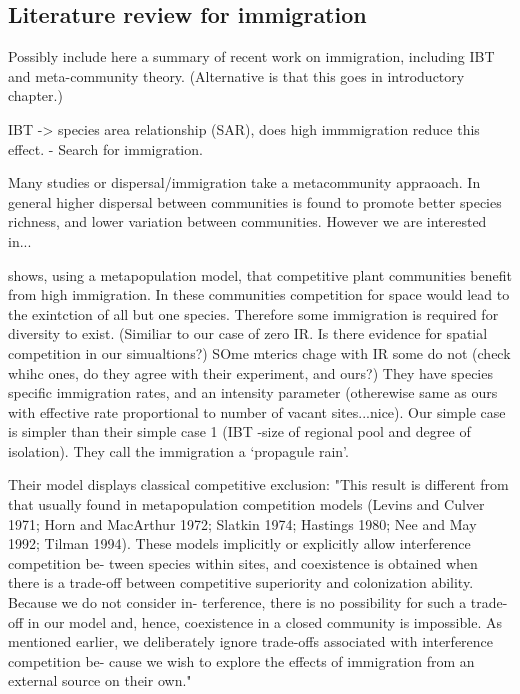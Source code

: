 \begin{itemize}
\section{Literature review for immigration}

Possibly include here a summary of recent work on immigration, including IBT and meta-community theory. (Alternative is that this goes in introductory chapter.) 

IBT -> species area relationship (SAR), does high immmigration reduce this effect. \cite{warren2015islands} - Search for immigration.

\cite{klausmeier2001habitat} Many studies or dispersal/immigration take a metacommunity appraoach. In general higher dispersal between communities is found to promote better species richness, and lower variation between communities. However we are interested in...

\cite{loreau1999immigration} shows, using a metapopulation model, that competitive plant communities benefit from high immigration. In these communities competition for space would lead to the exintction of all but one species. Therefore some immigration is required for diversity to exist. (Similiar to our case of zero IR. Is there evidence for spatial competition in our simualtions?) SOme mterics chage with IR some do not (check whihc ones, do they agree with their experiment, and ours?)	They have species specific immigration rates, and an intensity parameter (otherewise same as ours with effective rate proportional to number of vacant sites...nice). Our simple case is simpler than their simple case 1 (IBT -size of regional pool and degree of isolation). They call the immigration a `propagule rain'.

Their model displays classical competitive exclusion: "This result is different from that usually found in
metapopulation competition models (Levins and Culver
1971; Horn and MacArthur 1972; Slatkin 1974; Hastings
1980; Nee and May 1992; Tilman 1994). These models
implicitly or explicitly allow interference competition be-
tween species within sites, and coexistence is obtained
when there is a trade-off between competitive superiority
and colonization ability. Because we do not consider in-
terference, there is no possibility for such a trade-off in
our model and, hence, coexistence in a closed community
is impossible. As mentioned earlier, we deliberately ignore
trade-offs associated with interference competition be-
cause we wish to explore the effects of immigration from
an external source on their own."


\end{itemize}
